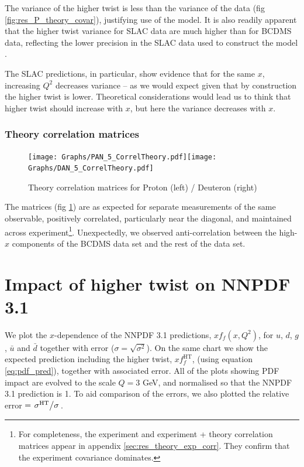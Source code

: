 \documentclass[12pt,a4paper]{report}
\newcommand*{\lr}[1]{\left( {#1} \right)}
\begin{document}
The variance of the higher twist is less than the variance of the data (fig \ref{fig:res_P_theory_covar}), justifying use of the model. It is also readily apparent that the higher twist variance for SLAC data are much higher than for BCDMS data, reflecting the lower precision in the SLAC data used to construct the model \cite{Milsztajn:Data}.

The SLAC predictions, in particular, show evidence that for the same $x$, increasing $Q^2$ decreases variance -- as we would expect given that by construction the higher twist is lower. Theoretical considerations would lead us to think that higher twist should increase with $x$, but here the variance decreases with $x$.

\subsubsection{Theory correlation matrices}

\begin{figure}[H]
\begin{center}
\texttt{[image: Graphs/PAN\_5\_CorrelTheory.pdf]}\texttt{[image: Graphs/DAN\_5\_CorrelTheory.pdf]}
\caption{Theory correlation matrices for Proton (left) / Deuteron (right)}
\label{fig:res_theory_correl}
\end{center}
\end{figure}

The matrices (fig \ref{fig:res_theory_correl}) are as expected for separate measurements of the same observable, positively correlated, particularly near the diagonal, and maintained across experiment\footnote{For completeness, the experiment and experiment + theory correlation matrices appear in appendix \ref{sec:res_theory_exp_corr}. They confirm that the experiment covariance dominates.}. Unexpectedly, we observed anti-correlation between the high-$x$ components of the BCDMS data set and the rest of the data set.

\section{Impact of higher twist on NNPDF 3.1}

We plot the $x$-dependence of the NNPDF 3.1 predictions, $x f_f \lr{x, Q^2}$, for $u$, $d$, $g$, $\bar{u}$ and $\bar{d}$ together with error ($\sigma = \sqrt{\sigma^2}$). On the same chart we show the expected prediction including the higher twist, $x f_f^{\textrm{HT}}$, (using equation \ref{eq:pdf_pred}), together with associated error. All of the plots showing PDF impact are evolved to the scale $Q=3$ GeV, and normalised so that the NNPDF 3.1 prediction is 1. To aid comparison of the errors, we also plotted the relative error $= \flatfrac{\sigma^{\textrm{HT}}}{\sigma}$.
\end{document}
